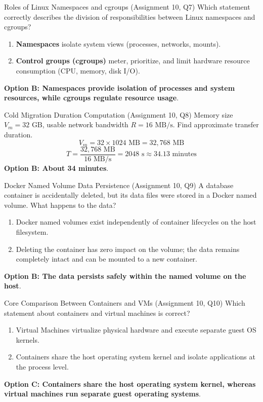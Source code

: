 \begin{solved}{Roles of Linux Namespaces and cgroups (Assignment 10, Q7)}
\Given Which statement correctly describes the division of responsibilities between Linux namespaces and cgroups?
\Steps
\begin{enumerate}[leftmargin=*]
  \item \textbf{Namespaces} isolate system views (processes, networks, mounts).
  \item \textbf{Control groups (cgroups)} meter, prioritize, and limit hardware resource consumption (CPU, memory, disk I/O).
\end{enumerate}
\Answer \textbf{Option B: Namespaces provide isolation of processes and system resources, while cgroups regulate resource usage}.
\end{solved}

\begin{solved}{Cold Migration Duration Computation (Assignment 10, Q8)}
\Given Memory size $V_m = 32\text{ GB}$, usable network bandwidth $R = 16\text{ MB/s}$. Find approximate transfer duration.
\Steps
\begin{equation}
V_m = 32 \times 1024\text{ MB} = 32,768\text{ MB}
\end{equation}
\begin{equation}
T = \frac{32,768\text{ MB}}{16\text{ MB/s}} = 2048\text{ s} \approx 34.13\text{ minutes}
\end{equation}
\Answer \textbf{Option B: About 34 minutes}.
\end{solved}

\begin{solved}{Docker Named Volume Data Persistence (Assignment 10, Q9)}
\Given A database container is accidentally deleted, but its data files were stored in a Docker named volume. What happens to the data?
\Steps
\begin{enumerate}[leftmargin=*]
  \item Docker named volumes exist independently of container lifecycles on the host filesystem.
  \item Deleting the container has zero impact on the volume; the data remains completely intact and can be mounted to a new container.
\end{enumerate}
\Answer \textbf{Option B: The data persists safely within the named volume on the host}.
\end{solved}

\begin{solved}{Core Comparison Between Containers and VMs (Assignment 10, Q10)}
\Given Which statement about containers and virtual machines is correct?
\Steps
\begin{enumerate}[leftmargin=*]
  \item Virtual Machines virtualize physical hardware and execute separate guest OS kernels.
  \item Containers share the host operating system kernel and isolate applications at the process level.
\end{enumerate}
\Answer \textbf{Option C: Containers share the host operating system kernel, whereas virtual machines run separate guest operating systems}.
\end{solved}
